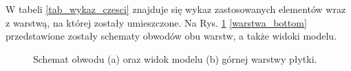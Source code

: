 \documentclass[12pt]{article} %
\numberwithin{equation}{subsection}
\numberwithin{figure}{section}
\numberwithin{table}{section}
\begin{document}
		\newpage
	
		W tabeli \ref{tab_wykaz_czesci}	znajduje się wykaz zastosowanych elementów wraz z warstwą, na której zostały umieszczone. Na Rys. \ref{warstwa_top} \ref{warstwa_bottom} przedstawione zostały schematy obwodów obu warstw, a także widoki modelu. 
	
		\begin{figure}[!h]
			\centering
			\caption{Schemat obwodu (a) oraz widok modelu (b) górnej warstwy płytki.}
			\label{warstwa_top}
		\end{figure} 		
		
\end{document}
